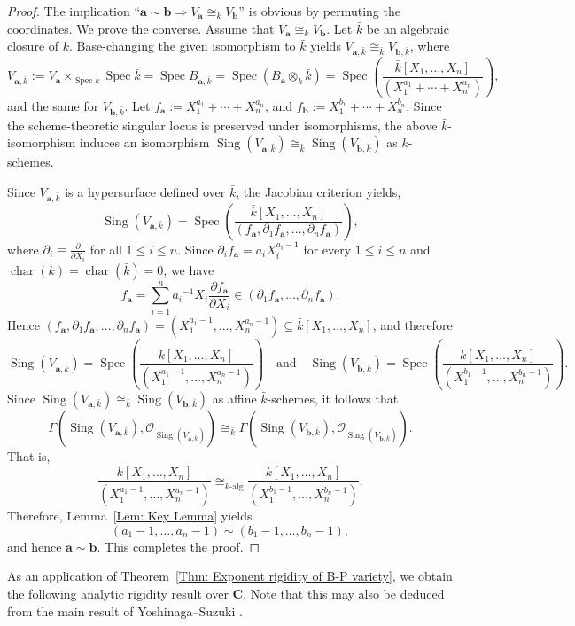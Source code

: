 \documentclass[english,10pt,reqno,twoside]{amsart}
\numberwithin{equation}{section}
\numberwithin{figure}{section}
\theoremstyle{plain}
\theoremstyle{plain}
\theoremstyle{definition}
\theoremstyle{plain}
\numberwithin{equation}{section}
\newcommand{\C}{\mathbf{C}}
\newcommand{\ba}{\mathbf{a}}
\newcommand{\bb}{\mathbf{b}}
\newcommand{\Spec}{\operatorname{Spec}}
\newcommand{\Sing}{\operatorname{Sing}}
\begin{document}
\begin{proof}
The implication ``$\ba\sim\bb \Rightarrow V_\ba\cong_k V_\bb$'' is obvious by permuting the coordinates. We prove the converse. Assume that $V_\ba\cong_k V_\bb$. Let $\bar{k}$ be an algebraic closure of $k$. Base-changing the given isomorphism to $\bar{k}$ yields $V_{\ba,\bar{k}}\cong_{\bar{k}} V_{\bb,\bar{k}}$, where $$V_{\ba,\bar{k}}:=V_\ba\times_{\Spec k} \Spec \bar{k}=\Spec B_{\ba,\bar{k}}= \Spec(B_\ba\otimes_k \bar{k})=\Spec\!\left(
\frac{\bar{k}[X_1,\ldots,X_n]}
{(X_1^{a_1}+\cdots+X_n^{a_n})}
\right),$$ and the same for $V_{\bb,\bar{k}}$. Let $f_\ba:=X_1^{a_1}+\cdots+X_n^{a_n}$, and $f_\bb:=X_1^{b_1}+\cdots+X_n^{b_n}$. Since the scheme-theoretic singular locus is preserved under isomorphisms, the above $\bar{k}$-isomorphism induces an isomorphism $\Sing(V_{\ba,\bar{k}})\cong_{\bar{k}} \Sing(V_{\bb,\bar{k}})$ as $\bar{k}$-schemes.

Since $V_{\ba, \bar{k}}$ is a hypersurface defined over $\bar{k}$, the Jacobian criterion yields, 
\[
\Sing(V_{\ba,\bar{k}})
=
\Spec\!\left(
\frac{\bar{k}[X_1,\ldots,X_n]}
{(f_\ba,\partial_1f_\ba,\ldots,\partial_nf_\ba)}
\right),
\]
where $\partial_i\equiv\frac{\partial}{\partial X_i}$ for all $1 \le i \le n$. Since $\partial_i f_\ba=a_iX_i^{a_i-1}$ for every $1\le i\le n$
and $\operatorname{char}(k)=\operatorname{char}(\bar{k})=0$, we have
\[
f_\ba
=
\sum_{i=1}^n
{a_i}^{-1}
X_i\frac{\partial f_\ba}{\partial X_i}
\in
(\partial_1f_\ba,\ldots,\partial_nf_\ba).
\]
Hence $(f_\ba,\partial_1f_\ba,\ldots,\partial_nf_\ba)
=
(X_1^{a_1-1},\ldots,X_n^{a_n-1}) \subseteq \bar{k}[X_1,\ldots,X_n]$, and therefore
\[
\Sing(V_{\ba,\bar{k}})
=
\Spec\!\left(
\frac{\bar{k}[X_1,\ldots,X_n]}
{(X_1^{a_1-1},\ldots,X_n^{a_n-1})}
\right) \quad \text{and} \quad \Sing(V_{\bb,\bar{k}})
=
\Spec\!\left(
\frac{\bar{k}[X_1,\ldots,X_n]}
{(X_1^{b_1-1},\ldots,X_n^{b_n-1})}
\right).
\]
Since $\Sing(V_{\ba,\bar{k}})\cong_{\bar{k}}\Sing(V_{\bb,\bar{k}})$ as affine $\bar{k}$-schemes, it follows that
\[
\Gamma(\Sing(V_{\ba,\bar{k}}),\mathcal O_{\Sing(V_{\ba,\bar{k}})})
\cong_{\bar{k}}
\Gamma(\Sing(V_{\bb,\bar{k}}),\mathcal O_{\Sing(V_{\bb,\bar{k}})}).
\]
That is,
\[
\frac{\bar{k}[X_1,\ldots,X_n]}
{(X_1^{a_1-1},\ldots,X_n^{a_n-1})}
\cong_{\bar{k}\text{-alg}}
\frac{\bar{k}[X_1,\ldots,X_n]}
{(X_1^{b_1-1},\ldots,X_n^{b_n-1})}.
\]
Therefore, Lemma~\ref{Lem: Key Lemma} yields
\[
(a_1-1,\ldots,a_n-1)\sim(b_1-1,\ldots,b_n-1),
\]
and hence $\ba\sim\bb$. This completes the proof.
\end{proof}

As an application of Theorem~\ref{Thm: Exponent rigidity of B-P variety}, we obtain the following analytic rigidity result over $\C$. Note that this may also be deduced from the main result of Yoshinaga--Suzuki \cite{YS1978}.
\end{document}
